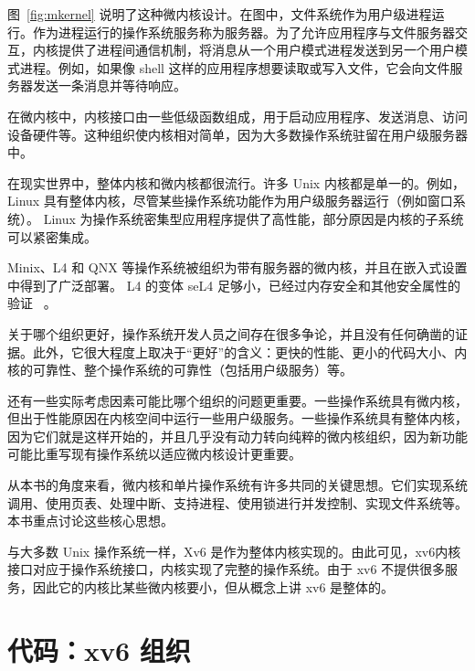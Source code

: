 图~\ref{fig:mkernel}    说明了这种微内核设计。在图中，文件系统作为用户级进程运行。作为进程运行的操作系统服务称为服务器。为了允许应用程序与文件服务器交互，内核提供了进程间通信机制，将消息从一个用户模式进程发送到另一个用户模式进程。例如，如果像 shell 这样的应用程序想要读取或写入文件，它会向文件服务器发送一条消息并等待响应。  

在微内核中，内核接口由一些低级函数组成，用于启动应用程序、发送消息、访问设备硬件等。这种组织使内核相对简单，因为大多数操作系统驻留在用户级服务器中。  

在现实世界中，整体内核和微内核都很流行。许多 Unix 内核都是单一的。例如，Linux 具有整体内核，尽管某些操作系统功能作为用户级服务器运行（例如窗口系统）。 Linux 为操作系统密集型应用程序提供了高性能，部分原因是内核的子系统可以紧密集成。  

Minix、L4 和 QNX 等操作系统被组织为带有服务器的微内核，并且在嵌入式设置中得到了广泛部署。 L4 的变体 seL4 足够小，已经过内存安全和其他安全属性的验证~    \cite{sel4}    。  

关于哪个组织更好，操作系统开发人员之间存在很多争论，并且没有任何确凿的证据。此外，它很大程度上取决于“更好”的含义：更快的性能、更小的代码大小、内核的可靠性、整个操作系统的可靠性（包括用户级服务）等。  

还有一些实际考虑因素可能比哪个组织的问题更重要。一些操作系统具有微内核，但出于性能原因在内核空间中运行一些用户级服务。一些操作系统具有整体内核，因为它们就是这样开始的，并且几乎没有动力转向纯粹的微内核组织，因为新功能可能比重写现有操作系统以适应微内核设计更重要。  

从本书的角度来看，微内核和单片操作系统有许多共同的关键思想。它们实现系统调用、使用页表、处理中断、支持进程、使用锁进行并发控制、实现文件系统等。本书重点讨论这些核心思想。  

与大多数 Unix 操作系统一样，Xv6 是作为整体内核实现的。由此可见，xv6内核接口对应于操作系统接口，内核实现了完整的操作系统。由于 xv6 不提供很多服务，因此它的内核比某些微内核要小，但从概念上讲 xv6 是整体的。  

   \section{代码：xv6 组织  }     

